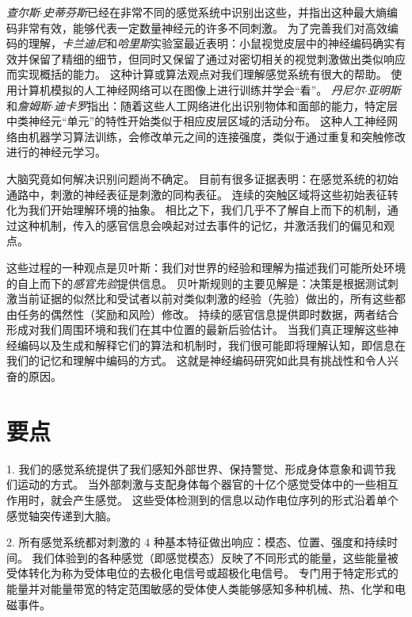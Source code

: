 \textit{查尔斯$\cdot$史蒂芬斯}已经在非常不同的感觉系统中识别出这些，并指出这种最大熵编码非常有效，能够代表一定数量神经元的许多不同刺激\cite{stevens2018conserved,stevens2015fly}。
为了完善我们对高效编码的理解，\textit{卡兰迪尼}和\textit{哈里斯}实验室最近表明：小鼠视觉皮层中的神经编码确实有效并保留了精细的细节，但同时又保留了通过对密切相关的视觉刺激做出类似响应而实现概括的能力\cite{stringer2019high}。
这种计算或算法观点对我们理解感觉系统有很大的帮助。
使用计算机模拟的人工神经网络可以在图像上进行训练并学会“看”。
\textit{丹尼尔$\cdot$亚明斯}和\textit{詹姆斯$\cdot$迪卡罗}指出：随着这些人工网络进化出识别物体和面部的能力，特定层中类神经元“单元”的特性开始类似于相应皮层区域的活动分布\cite{yamins2016using}。
这种人工神经网络由机器学习算法训练，会修改单元之间的连接强度，类似于通过重复和突触修改进行的神经元学习。


大脑究竟如何解决识别问题尚不确定。
目前有很多证据表明：在感觉系统的初始通路中，刺激的神经表征是刺激的同构表征。
连续的突触区域将这些初始表征转化为我们开始理解环境的抽象。
相比之下，我们几乎不了解自上而下的机制，通过这种机制，传入的感官信息会唤起对过去事件的记忆，并激活我们的偏见和观点。


这些过程的一种观点是贝叶斯：我们对世界的经验和理解为描述我们可能所处环境的自上而下的\textit{感官先验}提供信息。
贝叶斯规则的主要见解是：决策是根据测试刺激当前证据的似然比和受试者以前对类似刺激的经验（先验）做出的，所有这些都由任务的偶然性（奖励和风险）修改。
持续的感官信息提供即时数据，两者结合形成对我们周围环境和我们在其中位置的最新后验估计。
当我们真正理解这些神经编码以及生成和解释它们的算法和机制时，我们很可能即将理解认知，即信息在我们的记忆和理解中编码的方式。
这就是神经编码研究如此具有挑战性和令人兴奋的原因。



\section{要点}

1. 我们的感觉系统提供了我们感知外部世界、保持警觉、形成身体意象和调节我们运动的方式。
当外部刺激与支配身体每个器官的十亿个感觉受体中的一些相互作用时，就会产生感觉。
这些受体检测到的信息以动作电位序列的形式沿着单个感觉轴突传递到大脑。

2. 所有感觉系统都对刺激的 4 种基本特征做出响应：模态、位置、强度和持续时间。
我们体验到的各种感觉（即感觉模态）反映了不同形式的能量，这些能量被受体转化为称为受体电位的去极化电信号或超极化电信号。
专门用于特定形式的能量并对能量带宽的特定范围敏感的受体使人类能够感知多种机械、热、化学和电磁事件。


